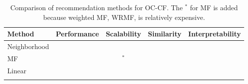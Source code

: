 \begin{table*}[!t]
	\centering

		\begin{tabular}{llccc}
		\toprule
		\toprule	
		\textbf{Method} & \textbf{Performance} & \textbf{Scalability} & \textbf{Similarity} & \textbf{Interpretability} \\
		\toprule
		Neighborhood & \cross & \tick & \tick & \tick \\
		MF & \cross & \tick$^*$  & \cross & \cross \\
		Linear & \tick & \cross & \tick & \tick \\
		\LinearLow & \tick & \tick & \tick & \tick \\
		\bottomrule
		\end{tabular}
	\caption{Comparison of recommendation methods for OC-CF. The $^*$ for MF is added because weighted MF, WRMF, is relatively expensive.}
	\label{tbl:comparison}
\end{table*}
